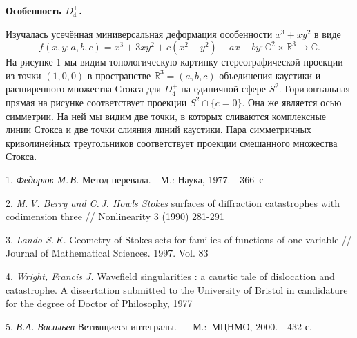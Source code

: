 \textbf{Особенность $D_{4}^+$.}

	Изучалась усечённая миниверсальная деформация особенности $x^3+xy^2$ в виде $$f(x,y;a,b,c)=x^3+3xy^2+c(x^2-y^2)-ax-by:\mathbb{C}^2\times\mathbb{R}^3\rightarrow\mathbb{C}.$$ На рисунке 1 мы видим топологическую картинку стереографической проекции из точки $(1,0,0)$ в пространстве $\mathbb{R}^3=(a,b,c)$ объединения каустики и расширенного множества Стокса для $D_4^+$ на единичной сфере $S^2.$ Горизонтальная прямая на рисунке соответствует проекции $S^2\cap\{c=0\}$. Она же является осью симметрии. На ней мы видим две точки, в которых сливаются комплексные линии Стокса и две точки слияния линий каустики. Пара симметричных криволинейных треугольников соответствует проекции смешанного множества Стокса.

\litlist

1. {\it Федорюк М.\,В.} Метод перевала. - М.: Наука, 1977. - 366~с


2. {\it M.\,V. Berry and C.\,J. Howls Stokes} surfaces of diffraction catastrophes with codimension three // Nonlinearity 3 (1990) 281-291

3. {\it Lando S.\,K.} Geometry of Stokes sets for families of functions of one
variable // Journal of Mathematical Sciences. 1997. Vol. 83

4. {\it Wright, Francis J.} Wavefield singularities : a caustic tale of dislocation and catastrophe. A dissertation submitted to the University of Bristol
in candidature for the degree of Doctor of Philosophy, 1977


5. {\it В.А. Васильев} Ветвящиеся интегралы. --- М.:~МЦНМО, 2000. - 432 с.

\vspace{2em}
